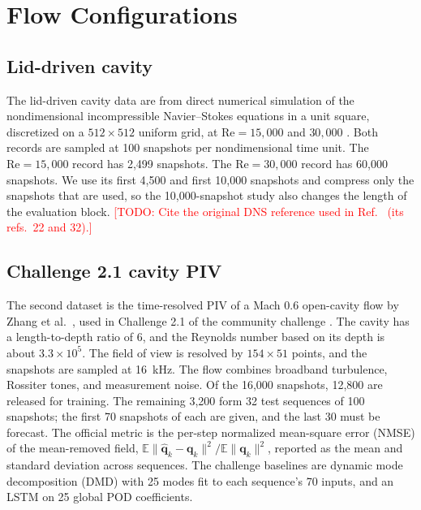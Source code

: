 \documentclass[conf]{new-aiaa}
\newcommand{\todo}[1]{\textcolor{red}{[TODO: #1]}}
\newcommand{\Rey}{\mathrm{Re}}
\begin{document}
\section{Flow Configurations}
\label{sec:flows}

\subsection{Lid-driven cavity}
The lid-driven cavity data are from direct numerical simulation of the nondimensional incompressible Navier--Stokes equations in a unit square, discretized on a $512\times512$ uniform grid, at $\Rey=15{,}000$ and $30{,}000$ \cite{deshmukh2016sparse,morton2026scitech}. Both records are sampled at 100 snapshots per nondimensional time unit. The $\Rey=15{,}000$ record has 2,499 snapshots. The $\Rey=30{,}000$ record has 60,000 snapshots. We use its first 4,500 and first 10,000 snapshots and compress only the snapshots that are used, so the 10,000-snapshot study also changes the length of the evaluation block. \todo{Cite the original DNS reference used in Ref.~\cite{morton2026scitech} (its refs.\ 22 and 32).}

\subsection{Challenge 2.1 cavity PIV}
\label{sec:challenge}
The second dataset is the time-resolved PIV of a Mach 0.6 open-cavity flow by Zhang et al.~\cite{zhang2020samm}, used in Challenge 2.1 of the community challenge \cite{schmidt2026challenge}. The cavity has a length-to-depth ratio of 6, and the Reynolds number based on its depth is about $3.3\times10^5$. The field of view is resolved by $154\times51$ points, and the snapshots are sampled at 16~kHz. The flow combines broadband turbulence, Rossiter tones, and measurement noise. Of the 16,000 snapshots, 12,800 are released for training. The remaining 3,200 form 32 test sequences of 100 snapshots; the first 70 snapshots of each are given, and the last 30 must be forecast. The official metric is the per-step normalized mean-square error (NMSE) of the mean-removed field, $\mathbb{E}\|\hat{\mathbf{q}}_k-\mathbf{q}_k\|^2/\mathbb{E}\|\mathbf{q}_k\|^2$, reported as the mean and standard deviation across sequences. The challenge baselines are dynamic mode decomposition (DMD) \cite{schmid2010dmd} with 25 modes fit to each sequence's 70 inputs, and an LSTM on 25 global POD coefficients.
\end{document}
